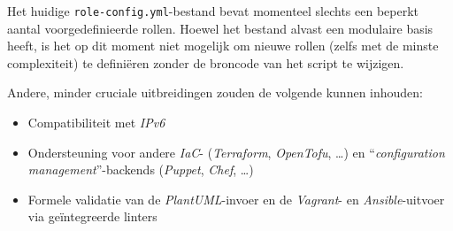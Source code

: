 Het huidige \texttt{role-config.yml}-bestand bevat momenteel slechts een beperkt aantal voorgedefinieerde rollen. Hoewel het bestand alvast een modulaire basis heeft, is het op dit moment niet mogelijk om nieuwe rollen (zelfs met de minste complexiteit) te definiëren zonder de broncode van het script te wijzigen.

Andere, minder cruciale uitbreidingen zouden de volgende kunnen inhouden:
\begin{itemize}
    \item Compatibiliteit met \emph{IPv6}
    \item Ondersteuning voor andere \emph{IaC}- (\emph{Terraform}, \emph{OpenTofu}, \ldots) en ``\emph{configuration management}''-backends (\emph{Puppet}, \emph{Chef}, \ldots)
    \item Formele validatie van de \emph{PlantUML}-invoer en de \emph{Vagrant}- en \emph{Ansible}-uitvoer via geïntegreerde linters
\end{itemize}